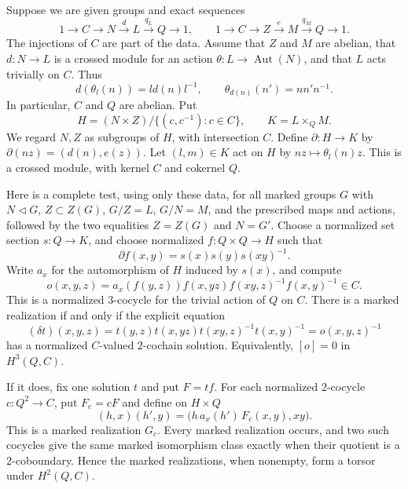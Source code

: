 \begin{theorem}
\label{C:baseline-free-realization}
Suppose we are given groups and exact sequences
\[
 1\longrightarrow C\longrightarrow N\xrightarrow{d}L
       \xrightarrow{q_L}Q\longrightarrow1,\qquad
 1\longrightarrow C\longrightarrow Z\xrightarrow{e}M
       \xrightarrow{q_M}Q\longrightarrow1.
\]
The injections of $C$ are part of the data.  Assume that $Z$ and $M$
are abelian, that $d:N\to L$ is a crossed module for an action
$\theta:L\to\operatorname{Aut}(N)$, and that $L$ acts trivially on $C$.
Thus
\[
 d(\theta_l(n))=l d(n)l^{-1},\qquad
 \theta_{d(n)}(n')=nn'n^{-1}.
\]
In particular, $C$ and $Q$ are abelian.  Put
\[
 H=(N\times Z)/\{(c,c^{-1}):c\in C\},\qquad K=L\times_Q M.
\]
We regard $N,Z$ as subgroups of $H$, with intersection $C$.
Define $\partial:H\to K$ by
$\partial(nz)=(d(n),e(z))$.  Let $(l,m)\in K$ act on $H$ by
$nz\mapsto\theta_l(n)z$.  This is a crossed module, with kernel $C$
and cokernel $Q$.

Here is a complete test, using only these data, for all marked groups
$G$ with $N\triangleleft G$, $Z\subset Z(G)$, $G/Z=L$, $G/N=M$,
and the prescribed maps and actions, followed by the two equalities
$Z=Z(G)$ and $N=G'$.
Choose a normalized set section $s:Q\to K$, and choose normalized
$f:Q\times Q\to H$ such that
\[
 \partial f(x,y)=s(x)s(y)s(xy)^{-1}.
\]
Write $a_x$ for the automorphism of $H$ induced by $s(x)$, and compute
\[
 o(x,y,z)=a_x(f(y,z))f(x,yz)f(xy,z)^{-1}f(x,y)^{-1}\in C.
                                                        \tag{C.4.3}
\]
This is a normalized $3$-cocycle for the trivial action of $Q$ on $C$.
There is a marked realization if and only if the explicit equation
\[
 (\delta t)(x,y,z)
 =t(y,z)t(x,yz)t(xy,z)^{-1}t(x,y)^{-1}=o(x,y,z)^{-1}
                                                        \tag{C.4.4}
\]
has a normalized $C$-valued $2$-cochain solution.  Equivalently,
$[o]=0$ in $H^3(Q,C)$.

If it does, fix one solution $t$ and put $F=tf$.  For each normalized
$2$-cocycle $c:Q^2\to C$, put $F_c=cF$ and define on $H\times Q$
\[
 (h,x)(h',y)=\bigl(h\,a_x(h')\,F_c(x,y),xy\bigr).
                                                        \tag{C.4.5}
\]
This is a marked realization $G_c$.  Every marked realization occurs,
and two such cocycles give the same marked isomorphism class exactly
when their quotient is a $2$-coboundary.  Hence the marked realizations,
when nonempty, form a torsor under $H^2(Q,C)$.


\end{theorem}
